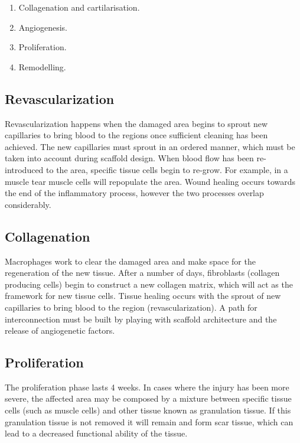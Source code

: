 \begin{multicols}{2}
	\begin{enumerate}
		\item Collagenation and cartilarisation.
		\item Angiogenesis.
		\item Proliferation.
		\item Remodelling.
	\end{enumerate}
\end{multicols}

	\subsection{Revascularization}
	Revascularization happens when the damaged area begins to sprout new capillaries to bring  blood to the regions once sufficient cleaning has been achieved.
	The new capillaries must sprout in an ordered manner, which must be taken into account during scaffold design.
	When blood flow has been re-introduced to the area, specific tissue cells begin to re-grow.
	For example, in a muscle tear muscle cells will repopulate the area.
	Wound healing occurs towards the end of the inflammatory process, however the two processes overlap considerably.

	\subsection{Collagenation}
	Macrophages work to clear the damaged area and make space for the regeneration of the new tissue.
	After a number of days, fibroblasts (collagen producing cells) begin to construct a new collagen matrix, which will act as the framework for new tissue cells.
	Tissue healing occurs with the sprout of new capillaries to bring blood to the region (revascularization).
	A path for interconnection must be built by playing with scaffold architecture and the release of angiogenetic factors.

	\subsection{Proliferation}
	The proliferation phase lasts 4 weeks.
	In cases where the injury has been more severe, the affected area may be composed by a mixture between specific tissue cells (such as muscle cells) and other tissue known as granulation tissue.
	If this granulation tissue is not removed it will remain and form scar tissue, which can lead to a decreased functional ability of the tissue.

